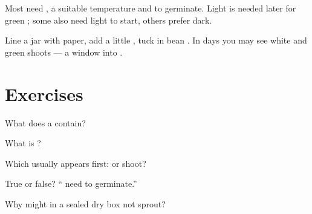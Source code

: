 \begin{proposition}\label{prop:g3:seeds:needs}
Most  need , a suitable temperature and  to germinate.
Light is needed later for green ; some  also need light
to start, others prefer dark.
\end{proposition}
\admitted

\begin{example}\label{ex:g3:seeds:jar}
Line a jar with paper, add a little , tuck in bean .
In days you may see white  and green shoots --- a window into
.
\end{example}

\section{Exercises}

\begin{exercise}[$\star$]\label{exo:g3:seeds:1}
What does a  contain?
\end{exercise}

\begin{exercise}[$\star$]\label{exo:g3:seeds:2}
What is ?
\end{exercise}

\begin{exercise}[$\star$]\label{exo:g3:seeds:3}
Which usually appears first:  or shoot?
\end{exercise}

\begin{exercise}[$\star$]\label{exo:g3:seeds:4}
True or false? `` need  to germinate.''
\end{exercise}

\begin{exercise}[$\star\star$]\label{exo:g3:seeds:5}
Why might  in a sealed dry box not sprout?
\end{exercise}

